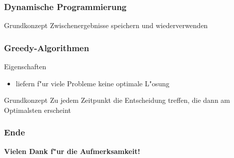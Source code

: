 \documentclass{beamer}
\begin{document}
\begin{frame}
\frametitle{Dynamische Programmierung}
\begin{alertblock}{Grundkonzept}
Zwischenergebnisse speichern und wiederverwenden
\end{alertblock}
\end{frame}


\begin{frame}
\frametitle{Greedy-Algorithmen}
\begin{block}{Eigenschaften}
\begin{itemize}
\item liefern f"ur viele Probleme keine optimale L"osung
\end{itemize}
\end{block}


\begin{alertblock}{Grundkonzept}
Zu jedem Zeitpunkt die Entscheidung treffen, die dann am Optimalsten erscheint
\end{alertblock}
\end{frame}


\begin{frame}
\frametitle{Ende}
\begin{center}
\textbf{\Huge Vielen Dank f"ur die Aufmerksamkeit!}
\end{center}
\end{frame}
\end{document}
